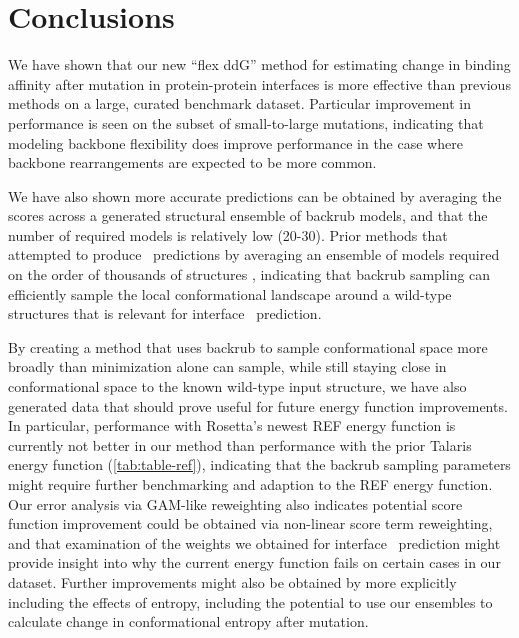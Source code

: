\section{Conclusions}

We have shown that our new ``flex ddG'' method for estimating change in binding affinity after mutation in protein-protein interfaces is more effective than previous methods on a large, curated benchmark dataset.
Particular improvement in performance is seen on the subset of small-to-large mutations, indicating that modeling backbone flexibility does improve performance in the case where backbone rearrangements are expected to be more common.

We have also shown more accurate predictions can be obtained by averaging the scores across a generated structural ensemble of backrub models, and that the number of required models is relatively low (20-30).
Prior methods that attempted to produce \ddg\ predictions by averaging an ensemble of models required on the order of thousands of structures  \cite{benedix_predicting_2009}, indicating that backrub sampling can efficiently sample the local conformational landscape around a wild-type structures that is relevant for interface \ddg\ prediction.

By creating a method that uses backrub to sample conformational space more broadly than minimization alone can sample, while still staying close in conformational space to the known wild-type input structure, we have also generated data that should prove useful for future energy function improvements.
In particular, performance with Rosetta's newest REF energy function\cite{alford_rosetta_2017} is currently not better in our method than performance with the prior Talaris energy function (\cref{tab:table-ref}), indicating that the backrub sampling parameters might require further benchmarking and adaption to the REF energy function.
Our error analysis via GAM-like reweighting also indicates potential score function improvement could be obtained via non-linear score term reweighting, and that examination of the weights we obtained for interface \ddg\ prediction might provide insight into why the current energy function fails on certain cases in our dataset.
Further improvements might also be obtained by more explicitly including the effects of entropy, including the potential to use our ensembles to calculate change in conformational entropy after mutation.


